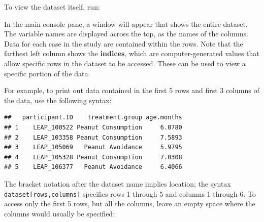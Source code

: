 To view the dataset itself, run:

\begin{knitrout}
\color{fgcolor}\begin{kframe}
\begin{alltt}
\end{alltt}
\end{kframe}
\end{knitrout}

In the main console pane, a window will appear that shows the entire dataset. The variable names are displayed across the top, as the names of the columns. Data for each case in the study are contained within the rows. Note that the farthest left column shows the \textbf{indices}, which are computer-generated values that allow specific rows in the dataset to be accessed. These can be used to view a specific portion of the data.

For example, to print out data contained in the first 5 rows and first 3 columns of the data, use the following syntax:

\begin{knitrout}
\color{fgcolor}\begin{kframe}
\begin{alltt}
\hlstd{LEAP[}\hlopt{:}\hlstd{,}\hlopt{:}\hlstd{]}
\end{alltt}
\begin{verbatim}
##   participant.ID    treatment.group age.months
## 1    LEAP_100522 Peanut Consumption     6.0780
## 2    LEAP_103358 Peanut Consumption     7.5893
## 3    LEAP_105069   Peanut Avoidance     5.9795
## 4    LEAP_105328 Peanut Consumption     7.0308
## 5    LEAP_106377   Peanut Avoidance     6.4066
\end{verbatim}
\end{kframe}
\end{knitrout}

The bracket notation after the dataset name implies location; the syntax \texttt{dataset[rows,columns]} specifies rows 1 through 5 and columns 1 through 6. To access only the first 5 rows, but all the columns, leave an empty space where the columns would usually be specified:

